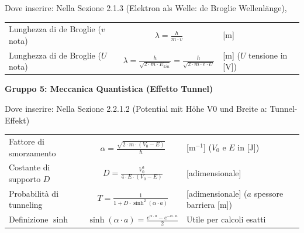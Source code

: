 Dove inserire: Nella Sezione 2.1.3 (Elektron als Welle: de Broglie Wellenlänge),

\begin{tabular}{lcl}
    Lunghezza di de Broglie ($v$ nota) & $\lambda = \frac{h}{m \cdot v}$ & [m] \\ 
    Lunghezza di de Broglie ($U$ nota) & $\lambda = \frac{h}{\sqrt{2 \cdot m \cdot E_{kin}}} = \frac{h}{\sqrt{2 \cdot m \cdot e \cdot U}}$ & [m] ($U$ tensione in [V]) \\ 
\end{tabular}

\textbf{Gruppo 5: Meccanica Quantistica (Effetto Tunnel)}

Dove inserire: Nella Sezione 2.2.1.2 (Potential mit Höhe V0 und Breite a: Tunnel-Effekt)

\begin{tabular}{lcl}
    Fattore di smorzamento & $\alpha = \frac{\sqrt{2 \cdot m \cdot (V_0 - E)}}{\hbar}$ & [m$^{-1}$] ($V_0$ e $E$ in [J]) \\ 
    Costante di supporto $D$ & $D = \frac{V_0^2}{4 \cdot E \cdot (V_0 - E)}$ & [adimensionale] \\ 
    Probabilità di tunneling & $T = \frac{1}{1 + D \cdot \sinh^2(\alpha \cdot a)}$ & [adimensionale] ($a$ spessore barriera [m]) \\ 
    Definizione $\sinh$ & $\sinh(\alpha \cdot a) = \frac{e^{\alpha \cdot a} - e^{-\alpha \cdot a}}{2}$ & Utile per calcoli esatti \\ 
\end{tabular}